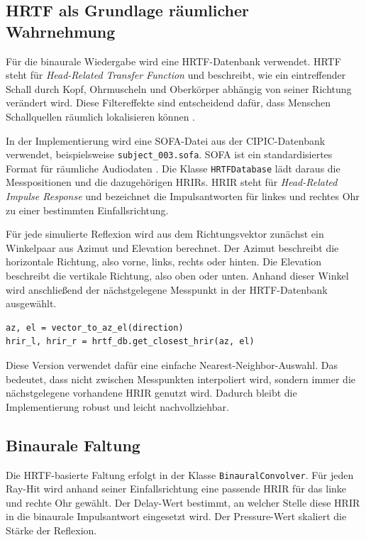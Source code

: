 \subsection{HRTF als Grundlage räumlicher Wahrnehmung}
\label{subsec:hrtf_foundation}

Für die binaurale Wiedergabe wird eine HRTF-Datenbank verwendet. HRTF steht für \textit{Head-Related Transfer Function} und beschreibt, wie ein eintreffender Schall durch Kopf, Ohrmuscheln und Oberkörper abhängig von seiner Richtung verändert wird. Diese Filtereffekte sind entscheidend dafür, dass Menschen Schallquellen räumlich lokalisieren können \parencite{vorlaender2008}.

In der Implementierung wird eine SOFA-Datei aus der CIPIC-Datenbank \parencite{algazi2001} verwendet, beispielsweise \texttt{subject\_003.sofa}. SOFA ist ein standardisiertes Format für räumliche Audiodaten \parencite{aes69}. Die Klasse \texttt{HRTFDatabase} lädt daraus die Messpositionen und die dazugehörigen HRIRs. HRIR steht für \textit{Head-Related Impulse Response} und bezeichnet die Impulsantworten für linkes und rechtes Ohr zu einer bestimmten Einfallsrichtung.

Für jede simulierte Reflexion wird aus dem Richtungsvektor zunächst ein Winkelpaar aus Azimut und Elevation berechnet. Der Azimut beschreibt die horizontale Richtung, also vorne, links, rechts oder hinten. Die Elevation beschreibt die vertikale Richtung, also oben oder unten. Anhand dieser Winkel wird anschließend der nächstgelegene Messpunkt in der HRTF-Datenbank ausgewählt.

\begin{lstlisting}
az, el = vector_to_az_el(direction)
hrir_l, hrir_r = hrtf_db.get_closest_hrir(az, el)
\end{lstlisting}

Diese Version verwendet dafür eine einfache Nearest-Neighbor-Auswahl. Das bedeutet, dass nicht zwischen Messpunkten interpoliert wird, sondern immer die nächstgelegene vorhandene HRIR genutzt wird. Dadurch bleibt die Implementierung robust und leicht nachvollziehbar.

\subsection{Binaurale Faltung}
\label{subsec:binaural_convolution_hrtf}

Die HRTF-basierte Faltung erfolgt in der Klasse \texttt{BinauralConvolver}. Für jeden Ray-Hit wird anhand seiner Einfallsrichtung eine passende HRIR für das linke und rechte Ohr gewählt. Der Delay-Wert bestimmt, an welcher Stelle diese HRIR in die binaurale Impulsantwort eingesetzt wird. Der Pressure-Wert skaliert die Stärke der Reflexion.

